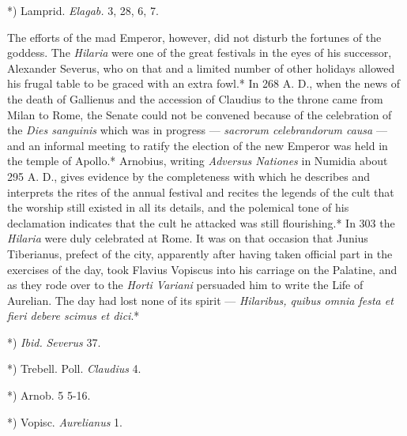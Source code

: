 \documentclass[a4paper, 11pt, oneside, polutonikogreek, english]{article}
\begin{document}
*) Lamprid. \emph{Elagab.} 3, 28, 6, 7.

The efforts of the mad Emperor, however, did not disturb the fortunes of the goddess. The \emph{Hilaria} were one of the great festivals in the eyes of his successor, Alexander Severus, who on that and a limited number of other holidays allowed his frugal table to be graced with an extra fowl.* In 268 A. D., when the news of the death of Gallienus and the accession of Claudius to the throne came from Milan to Rome, the Senate could not be convened because of the celebration of the \emph{Dies sanguinis} which was in progress --- \emph{sacrorum celebrandorum causa} --- and an informal meeting to ratify the election of the new Emperor was held in the temple of Apollo.* Arnobius, writing \emph{Adversus Nationes} in Numidia about 295 A. D., gives evidence by the completeness with which he describes and interprets the rites of the annual festival and recites the legends of the cult that the worship still existed in all its details, and the polemical tone of his declamation indicates that the cult he attacked was still flourishing.* In 303 the \emph{Hilaria} were duly celebrated at Rome. It was on that occasion that Junius Tiberianus, prefect of the city, apparently after having taken official part in the exercises of the day, took Flavius Vopiscus into his carriage on the Palatine, and as they rode over to the \emph{Horti Variani} persuaded him to write the Life of Aurelian. The day had lost none of its spirit --- \emph{Hilaribus, quibus omnia festa et fieri debere scimus et dici}.*

*) \emph{Ibid.} \emph{Severus} 37.

*) Trebell. Poll. \emph{Claudius} 4.

*) Arnob. 5 5-16.

*) Vopisc. \emph{Aurelianus} 1.
\end{document}

